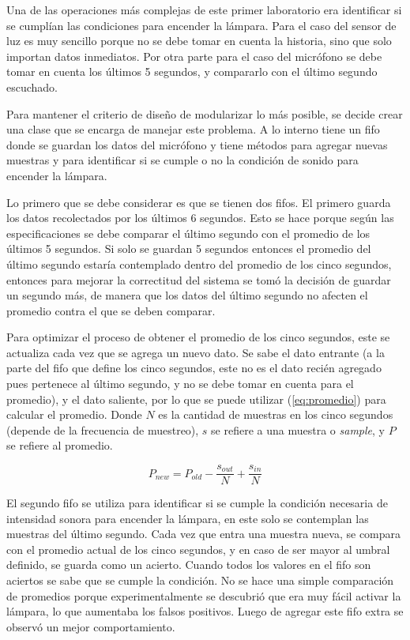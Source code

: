 Una de las operaciones más complejas de este primer laboratorio era identificar si se cumplían las
condiciones para encender la lámpara. Para el caso del sensor de luz es muy sencillo porque no se
debe tomar en cuenta la historia, sino que solo importan datos inmediatos. Por otra parte para el
caso del micrófono se debe tomar en cuenta los últimos 5 segundos, y compararlo con el último
segundo escuchado.

Para mantener el criterio de diseño de modularizar lo más posible, se decide crear una clase que se
encarga de manejar este problema. A lo interno tiene un fifo donde se guardan los datos del
micrófono y tiene métodos para agregar nuevas muestras y para identificar si se cumple o no la
condición de sonido para encender la lámpara.

Lo primero que se debe considerar es que se tienen dos fifos. El primero guarda los datos
recolectados por los últimos 6 segundos. Esto se hace porque según las especificaciones se debe
comparar el último segundo con el promedio de los últimos 5 segundos. Si solo se guardan 5 segundos
entonces el promedio del último segundo estaría contemplado dentro del promedio de los cinco
segundos, entonces para mejorar la correctitud del sistema se tomó la decisión de guardar un segundo
más, de manera que los datos del último segundo no afecten el promedio contra el que se deben
comparar.

Para optimizar el proceso de obtener el promedio de los cinco segundos, este se
actualiza cada vez que se agrega un nuevo dato. Se sabe el dato entrante (a la parte del fifo que
define los cinco segundos, este no es el dato recién agregado pues pertenece al último segundo, y
no se debe tomar en cuenta para el promedio), y el dato saliente, por lo que se puede utilizar
(\ref{eq:promedio}) para calcular el promedio. Donde $N$ es la cantidad de muestras en los cinco
segundos (depende de la frecuencia de muestreo), $s$ se refiere a una muestra o \textit{sample}, y
$P$ se refiere al promedio.

\begin{equation}
  P_{new} = P_{old}-\frac{s_{out}}{N}+\frac{s_{in}}{N}
\end{equation}

El segundo fifo se utiliza para identificar si se cumple la condición necesaria de intensidad sonora
para encender la lámpara, en este solo se contemplan las muestras del último segundo.  Cada vez que
entra una muestra nueva, se compara con el promedio actual de los cinco segundos, y en caso de ser
mayor al umbral definido, se guarda como un acierto. Cuando todos los valores en el fifo son
aciertos se sabe que se cumple la condición. No se hace una simple comparación de promedios porque
experimentalmente se descubrió que era muy fácil activar la lámpara, lo que aumentaba los falsos
positivos. Luego de agregar este fifo extra se observó un mejor comportamiento.

